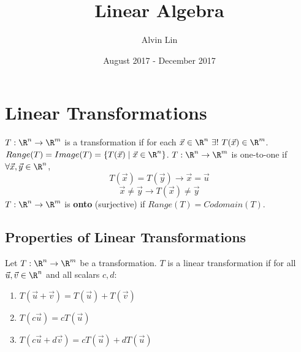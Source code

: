 \documentclass{math}
\title{Linear Algebra}
\author{Alvin Lin}
\date{August 2017 - December 2017}
\begin{document}
\maketitle

\section*{Linear Transformations}
\( T:\R^n\to\R^m \) is a transformation if for each \( \vec{x}\in\R^n~\exists!~
T(\vec{x})\in\R^m \). \( Range(T) = Image(T) = \{T(\vec{x})\mid\vec{x}\in\R^n\}
\). \( T:\R^n\to\R^m \) is one-to-one if \( \forall\vec{x},\vec{y}\in\R^n \),
\[ T(\vec{x}) = T(\vec{y}) \longrightarrow \vec{x} = \vec{u} \]
\[ \vec{x} \ne \vec{y} \longrightarrow T(\vec{x}) \ne \vec{y} \]
\( T:\R^n\to\R^m \) is \textbf{onto} (surjective) if \( Range(T) = Codomain(T)
\).

\subsection*{Properties of Linear Transformations}
Let \( T:\R^n\to\R^m \) be a transformation. \( T \) is a linear transformation
if for all \( \vec{u},\vec{v}\in\R^n \) and all scalars \( c,d \):
\begin{enumerate}
  \item \( T(\vec{u}+\vec{v}) = T(\vec{u})+T(\vec{v}) \)
  \item \( T(c\vec{u}) = cT(\vec{u}) \)
  \item \( T(c\vec{u}+d\vec{v}) = cT(\vec{u})+dT(\vec{u}) \)
\end{enumerate}
\end{document}
